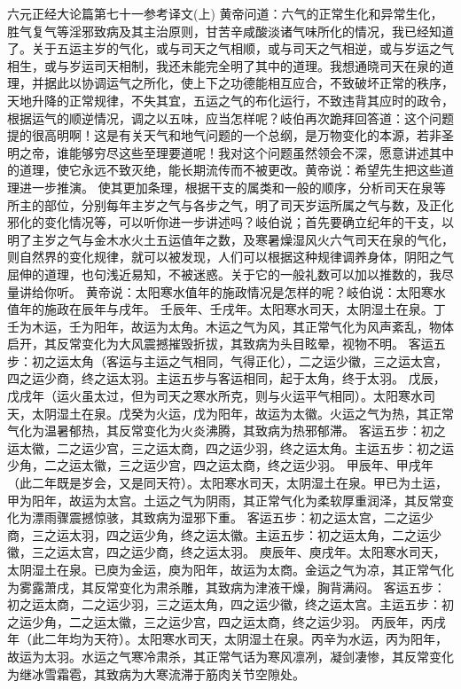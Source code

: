 \documentclass[12pt,UTF8]{ctexbook}
\begin{document}
六元正经大论篇第七十一参考译文(上)
黄帝问道：六气的正常生化和异常生化，胜气复气等淫邪致病及其主治原则，甘苦辛咸酸淡诸气味所化的情况，我已经知道了。关于五运主岁的气化，或与司天之气相顺，或与司天之气相逆，或与岁运之气相生，或与岁运司天相制，我还未能完全明了其中的道理。我想通晓司天在泉的道理，并据此以协调运气之所化，使上下之功德能相互应合，不致破坏正常的秩序，天地升降的正常规律，不失其宜，五运之气的布化运行，不致违背其应时的政令，根据运气的顺逆情况，调之以五味，应当怎样呢？岐伯再次跪拜回答道：这个问题提的很高明啊！这是有关天气和地气问题的一个总纲，是万物变化的本源，若非圣明之帝，谁能够穷尽这些至理要道呢！我对这个问题虽然领会不深，愿意讲述其中的道理，使它永远不致灭绝，能长期流传而不被更改。黄帝说：希望先生把这些道理进一步推演。
使其更加条理，根据干支的属类和一般的顺序，分析司天在泉等所主的部位，分别每年主岁之气与各步之气，明了司天岁运所属之气与数，及正化邪化的变化情况等，可以听你进一步讲述吗？岐伯说；首先要确立纪年的干支，以明了主岁之气与金木水火土五运值年之数，及寒暑燥湿风火六气司天在泉的气化，则自然界的变化规律，就可以被发现，人们可以根据这种规律调养身体，阴阳之气屈伸的道理，也句浅近易知，不被迷惑。关于它的一般礼数可以加以推数的，我尽量讲给你听。
黄帝说：太阳寒水值年的施政情况是怎样的呢？岐伯说：太阳寒水值年的施政在辰年与戌年。
壬辰年、壬戌年。太阳寒水司天，太阴湿土在泉。丁壬为木运，壬为阳年，故运为太角。木运之气为风，其正常气化为风声紊乱，物体启开，其反常变化为大风震撼摧毁折拔，其致病为头目眩晕，视物不明。
客运五步：初之运太角（客运与主运之气相同，气得正化），二之运少徽，三之运太宫，四之运少商，终之运太羽。主运五步与客运相同，起于太角，终于太羽。
戊辰，戊戌年（运火虽太过，但为司天之寒水所克，则与火运平气相同）。太阳寒水司天，太阴湿土在泉。戊癸为火运，戊为阳年，故运为太徽。火运之气为热，其正常气化为温暑郁热，其反常变化为火炎沸腾，其致病为热邪郁滞。
客运五步：初之运太徽，二之运少宫，三之运太商，四之运少羽，终之运太角。主运五步：初之运少角，二之运太徽，三之运少宫，四之运太商，终之运少羽。
甲辰年、甲戌年（此二年既是岁会，又是同天符）。太阳寒水司天，太阴湿土在泉。甲已为土运，甲为阳年，故运为太宫。土运之气为阴雨，其正常气化为柔软厚重润泽，其反常变化为漂雨骤震撼惊骇，其致病为湿邪下重。
客运五步：初之运太宫，二之运少商，三之运太羽，四之运少角，终之运太徽。主运五步：初之运太角，二之运少徽，三之运太宫，四之运少商，终之运太羽。
庾辰年、庾戌年。太阳寒水司天，太阴湿土在泉。已庾为金运，庾为阳年，故运为太商。金运之气为凉，其正常气化为雾露萧戌，其反常变化为肃杀雕，其致病为津液干燥，胸背满闷。
客运五步：初之运太商，二之运少羽，三之运太角，四之运少徽，终之运太宫。主运五步：初之运少角，二之运太徽，三之运少宫，四之运太商，终之运少羽。
丙辰年，丙戌年（此二年均为天符）。太阳寒水司天，太阴湿土在泉。丙辛为水运，丙为阳年，故运为太羽。水运之气寒冷肃杀，其正常气话为寒风凛冽，凝剑凄惨，其反常变化为继冰雪霜雹，其致病为大寒流滞于筋肉关节空隙处。
\end{document}

